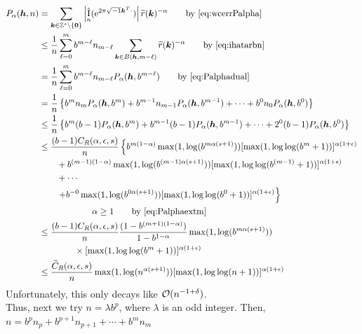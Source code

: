 \documentclass{amsart}
\newcommand{\tr}{\widetilde{r}}
\DeclareMathOperator{\appxint}{\hat{I}}
\begin{document}
\begin{align*}
      P_\alpha(\vh,n) & = \sum_{\vk \in \integers^s \setminus\{\vzero\}} \abs{\appxint_n(\me^{2 \pi \sqrt{-1} \vk^T \cdot})}\tr(\vk)^{-\alpha} \qquad \text{by \eqref{eq:wcerrPalpha}} \\
      & \le \frac {1}{n} \sum_{\ell = 0}^{m} b^{m-\ell} n_{m - \ell} \sum_{\vk \in B(\vh,m-\ell)} \tr(\vk)^{-\alpha}
      \qquad \text{by \eqref{eq:ihatarbn}}\\
      & = \frac {1}{n} \sum_{\ell = 0}^{m} b^{m-\ell} n_{m - \ell} P_\alpha(\vh,b^{m-\ell})
      \qquad \text{by \eqref{eq:Palphadual}}\\
      & =  \frac {1}{n} \left\{ b^m n_m P_\alpha(\vh,b^m) + b^{m-1} n_{m-1} P_\alpha(\vh,b^{m-1}) + \cdots + b^0 n_0 P_\alpha(\vh,b^0)  \right\} \\
      &\le \frac {1}{n} \left\{ b^m (b-1) P_\alpha(\vh,b^m) + b^{m-1} (b-1) P_\alpha(\vh,b^{m-1}) + \cdots + 2^0 (b-1) P_\alpha(\vh,b^0)  \right\} \\
      & \le \frac {(b-1)C_{R}(\alpha,\epsilon,s)}{n} \left\{ b^{m(1-\alpha)}\max(1, \log(b^{m\alpha(s+1)})) [\max(1,\log \log (
    b^m+1))]^{\alpha(1+\epsilon)}\right .\\ 
      & \qquad  + b^{(m-1)(1-\alpha)}\max(1, \log(b^{(m-1)\alpha(s+1)})) [\max(1,\log \log (
    b^{(m-1)}+1))]^{\alpha(1+\epsilon)}\\
      & \qquad + \cdots \\
      & \qquad  \left . + b^{-0}\max(1, \log(b^{0\alpha(s+1)})) [\max(1,\log \log (
    b^{0}+1))]^{\alpha(1+\epsilon)} \right\}\\
      & \qquad \qquad \qquad \alpha \ge 1 \qquad \text{by \eqref{eq:Palphaextm}}\\
      & \le \frac {(b-1)C_{R}(\alpha,\epsilon,s)}{n} \frac{(1 - b^{(m+1)(1-\alpha)})}{1 - b^{1-\alpha}}
      \max(1, \log(b^{m\alpha(s+1)})) \\
      & \qquad \qquad \times [\max(1,\log \log (
    b^m+1))]^{\alpha(1+\epsilon)} \\
      & \le \frac {\widetilde{C}_{R}(\alpha,\epsilon,s)}{n}
      \max(1, \log(n^{\alpha(s+1)}))
      [\max(1,\log \log (
    n+1))]^{\alpha(1+\epsilon)}
\end{align*}
Unfortunately, this only decays like $\operatorname{{\mathcal O}}(n^{-1+\delta})$. \\

Thus, next we try $n = \lambda b^p$, where $\lambda$ is an odd integer. Then, $n = b^pn_p + b^{p+1}n_{p+1} + \cdots + b^m n_m$ \\
\end{document}
